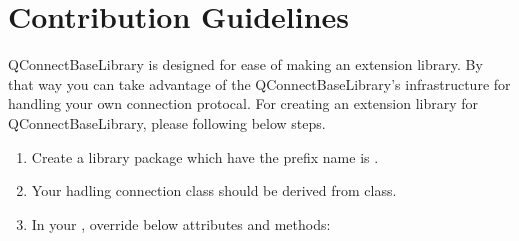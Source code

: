 \documentclass[letterpaper,10pt,english]{sphinxmanual}
\begin{document}
\chapter{Contribution Guidelines}
\label{\detokenize{index:contribution-guidelines}}
\sphinxAtStartPar
QConnectBaseLibrary is designed for ease of making an extension library. By that way you can take advantage of the QConnectBaseLibrary’s
infrastructure for handling your own connection protocal. For creating an extension library for QConnectBaseLibrary, please following below
steps.
\begin{enumerate}
%
\item {} 
\sphinxAtStartPar
Create a library package which have the prefix name is .

\item {} 
\sphinxAtStartPar
Your hadling connection class should be derived from   class.

\item {} 
\sphinxAtStartPar
In your , override below attributes and methods:

\end{enumerate}
\end{document}
